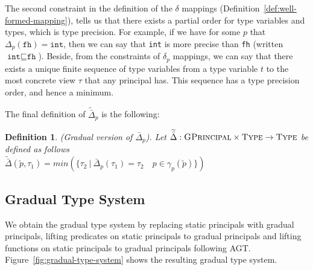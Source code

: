 \documentclass{article}
\newcommand\icode[1]{\texttt{#1}}
\newcommand\wt[1]{\widetilde{#1}}
\newtheorem{definition}{Definition}[section]
\begin{document}
The second constraint in the definition of the $\delta$ mappings (Definition~\ref{def:well-formed-mapping}), tells us that there exists a partial order for type variables and types, which is type precision. For example, if we have for some $p$ that $\Delta_p(\icode{fh}) = \icode{int}$, then we can say that \icode{int} is more precise than \icode{fh} (written $\icode{int} \sqsubseteq \icode{fh}$). Beside, from the constraints of $\delta_p$ mappings, we can say that there exists a unique finite sequence of type variables from a type variable $t$ to the most concrete view $\tau$ that any principal has. This sequence has a type precision order, and hence a minimum.

The final definition of $\wt{\bar{\Delta}}_p$ is the following:

\begin{definition}(Gradual version of $\bar{\Delta}_p$). Let $\wt{\bar{\Delta}} : \textsc{GPrincipal} \times \textsc{Type} \rightarrow \textsc{Type}$ be defined as follows\\
$\wt{\bar{\Delta}}(\wt{p},\tau_1)= min(\{\tau_2 \:| \: \bar{\Delta}_p(\tau_1) = \tau_2 \quad p \in \gamma_p(\wt{p}) \})$ \\
\end{definition}
 
\subsection{Gradual Type System}
We obtain the gradual type system by replacing static principals with gradual principals, lifting predicates on static principals to gradual principals and lifting functions on static principals to gradual principals following AGT. Figure~\ref{fig:gradual-type-system} shows the resulting gradual type system.
\end{document}
